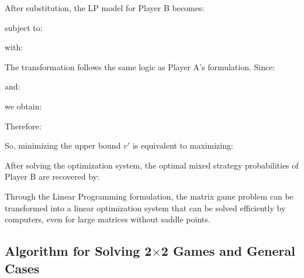 \documentclass[12pt,a4paper]{article}
\begin{document}
\vspace{0.1cm}
After substitution, the LP model for Player B becomes:
\vspace{0.1cm}

\noindent{}

subject to:

\noindent{} 

with:

\noindent{}

The transformation follows the same logic as Player A’s formulation. Since:
\vspace{0.1cm}

\noindent{}

and:

\noindent{}

we obtain:

\noindent{}

Therefore:

\noindent{}

\vspace{0.1cm}
So, minimizing the upper bound \(v'\) is equivalent to maximizing:
\vspace{0.1cm}

\noindent{}

After solving the optimization system, the optimal mixed strategy probabilities of Player B are recovered by:

\noindent{}

\vspace{0.15cm}
Through the Linear Programming formulation, the matrix game problem can be transformed into a linear optimization system that can be solved efficiently by computers, even for large matrices without saddle points.

\subsection{Algorithm for Solving 2$\times$2 Games and General Cases}
\end{document}
